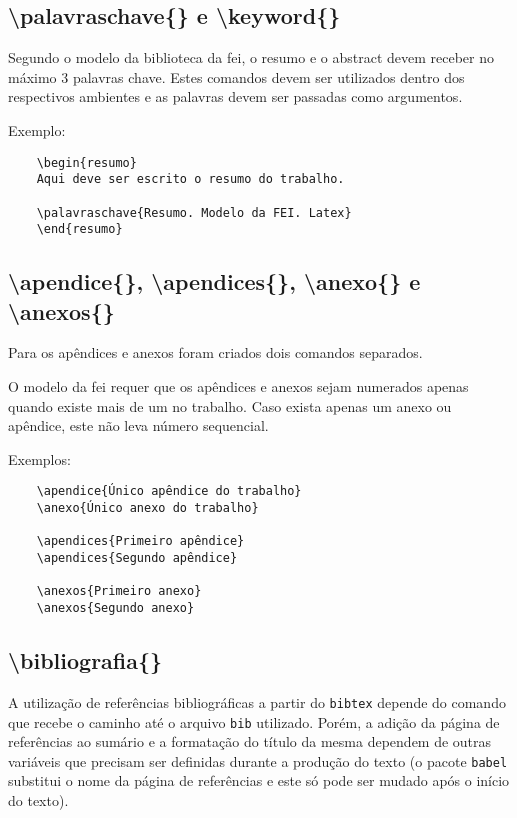 \documentclass{fei}
\begin{document}
    \subsection{\textbackslash palavraschave\{\} e \textbackslash keyword\{\}}
    Segundo o modelo da biblioteca da \gls{fei}, o resumo e o abstract devem receber no máximo 3 palavras chave. Estes comandos devem ser utilizados dentro dos respectivos ambientes e as palavras devem ser passadas como argumentos.

    Exemplo:
    \begin{verbatim}
    \begin{resumo}
    Aqui deve ser escrito o resumo do trabalho.

    \palavraschave{Resumo. Modelo da FEI. Latex}
    \end{resumo}
    \end{verbatim}
    
    \subsection{\textbackslash apendice\{\}, \textbackslash apendices\{\}, \textbackslash anexo\{\} e \textbackslash anexos\{\}}
    Para os apêndices e anexos foram criados dois comandos separados.

    O modelo da \gls{fei} requer que os apêndices e anexos sejam numerados apenas quando existe mais de um no trabalho. Caso exista apenas um anexo ou apêndice, este não leva número sequencial.

    Exemplos:
    
    \begin{verbatim}
    \apendice{Único apêndice do trabalho}
    \anexo{Único anexo do trabalho}

    \apendices{Primeiro apêndice}
    \apendices{Segundo apêndice}
    
    \anexos{Primeiro anexo}
    \anexos{Segundo anexo}
    \end{verbatim}

    \subsection{\textbackslash bibliografia\{\}}
    A utilização de referências bibliográficas a partir do \texttt{bibtex} depende do comando \verb++ que recebe o caminho até o arquivo \texttt{bib} utilizado. Porém, a adição da página de referências ao sumário e a formatação do título da mesma dependem de outras variáveis que precisam ser definidas durante a produção do texto (o pacote \texttt{babel} substitui o nome da página de referências e este só pode ser mudado após o início do texto).
\end{document}
